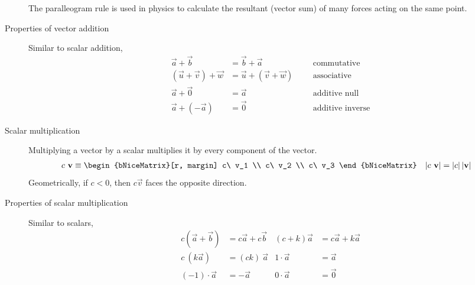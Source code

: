 \begin{description}
        The paralleogram rule is used in physics to calculate the resultant (vector sum)
        of many forces acting on the same point. \par

    \item[Properties of vector addition] Similar to scalar addition,
        \begin{align}
            \vec{a} + \vec{b}             & = \vec{b} + \vec{a}             &
                                          &                                 &
            \text{commutative}                                                \\
            (\vec{u} + \vec{v}) + \vec{w} & = \vec{u} + (\vec{v} + \vec{w}) &
                                          &                                 &
            \text{associative}                                                \\
            \vec{a} + \vec{0}             & = \vec{a}                       &
                                          &                                 &
            \text{additive null}                                              \\
            \vec{a} + (-\vec{a})          & = \vec{0}                       &
                                          &                                 &
            \text{additive inverse}
        \end{align}

    \item[Scalar multiplication] Multiplying a vector by a scalar multiplies it by
        every component of the vector.
        \begin{align}
            c\ \vec{v}         & \equiv \begin{bNiceMatrix}[r, margin]
                                            c\ v_1 \\ c\ v_2 \\ c\ v_3
                                        \end{bNiceMatrix} &
            \abs{ c\ \vec{v} } & = \abs{ c } \abs{ \vec{v} }
        \end{align}
        Geometrically, if $ c<0  $, then $ c \vec{v} $ faces the opposite direction.

    \item[Properties of scalar multiplication] Similar to scalars,
        \begin{align}
            c(\vec{a} + \vec{b}) & = c\vec{a} + c\vec{b} &
            (c + k)\vec{a}       & = c\vec{a} + k\vec{a}   \\
            c\ (k\vec{a})        & = (ck)\ \vec{a}       &
            1 \cdot \vec{a}      & = \vec{a}               \\
            (-1) \cdot \vec{a}   & = -\vec{a}            &
            0 \cdot \vec{a}      & = \vec{0}
        \end{align}


\end{description}
